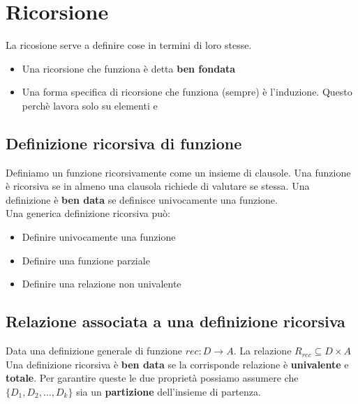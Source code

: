 \documentclass{article}
\begin{document}
\pagebreak

\section{Ricorsione}
La ricosione serve a definire cose in termini di loro stesse.
\begin{itemize}
    \item Una ricorsione che funziona è detta \textbf{ben fondata}
    \item Una forma specifica di ricorsione che funziona (sempre) è l'induzione. Questo perchè lavora solo su elementi  e 
\end{itemize}

\subsection{Definizione ricorsiva di funzione}
Definiamo un funzione ricorsivamente come un insieme di clausole. Una funzione è ricorsiva se in almeno una clausola richiede di valutare se stessa. Una definizione è \textbf{ben data} se definisce univocamente una funzione. \\
Una generica definizione ricorsiva può:
\begin{itemize}
    \item Definire univocamente una funzione
    \item Definire una funzione parziale
    \item Definire una relazione non univalente
\end{itemize}

\subsection{Relazione associata a una definizione ricorsiva}
Data una definizione generale di funzione \(rec: D \rightarrow A\). La relazione \(R_{rec} \subseteq D \times A\)
Una definizione ricorsiva è \textbf{ben data} se la corrisponde relazione è \textbf{univalente} e \textbf{totale}. Per garantire queste le due proprietà possiamo assumere che \(\{D_1, D_2, \ldots, D_k\}\) sia un \textbf{partizione} dell'insieme di partenza.
\end{document}
